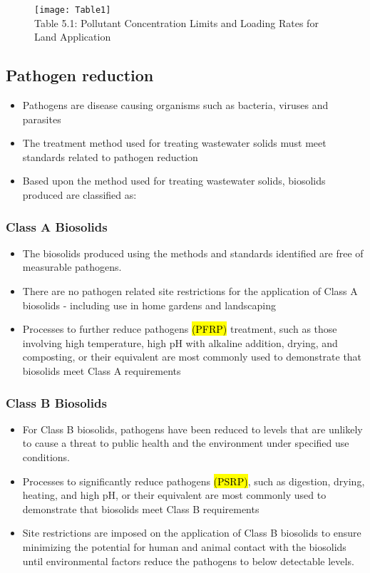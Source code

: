 \begin{figure}
	\begin{center}
		\texttt{[image: Table1]}\\
			Table 5.1: Pollutant Concentration Limits and Loading Rates for Land Application
	\end{center}
	\end{figure}
\subsection{Pathogen reduction}
			\begin{itemize}
				\item Pathogens are disease causing organisms such as bacteria, viruses and parasites
				\item The treatment method used for treating wastewater solids must meet standards related to pathogen reduction
				\item Based upon the method used for treating wastewater solids, biosolids produced are classified as:
				\end{itemize}
\subsubsection{Class A Biosolids}
					\begin{itemize}
								\item The biosolids produced using the methods and standards identified are free of measurable pathogens.
								\item There are no pathogen related site restrictions for the application of Class A biosolids - including use in home gardens and landscaping
								\item Processes to further reduce pathogens \hl{(PFRP)} treatment, such as those involving high temperature, high pH with alkaline addition, drying, and composting, or their equivalent are most commonly used to demonstrate that biosolids meet Class A requirements
							\end{itemize}
\subsubsection{Class B Biosolids} 
									\begin{itemize}
										\item For Class B biosolids, pathogens have been reduced to levels that are unlikely to cause a threat to public health and the environment under specified use conditions.
										\item Processes to significantly reduce pathogens \hl{(PSRP)}, such as digestion, drying, heating, and high pH, or their equivalent are most commonly used to demonstrate that biosolids meet Class B requirements
										\item Site restrictions are imposed on the application of Class B biosolids to ensure minimizing the potential for human and animal contact with the biosolids until environmental factors reduce the pathogens to below detectable levels.
									\end{itemize}
